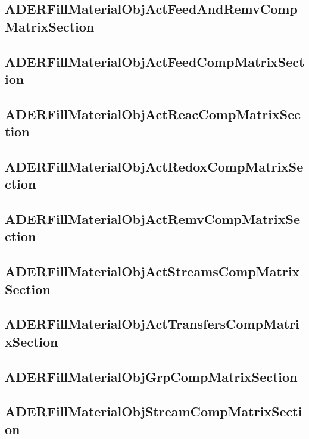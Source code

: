 \subsection{ADERFillMaterialObjActFeedAndRemvCompMatrixSection}


\subsection{ADERFillMaterialObjActFeedCompMatrixSection}


\subsection{ADERFillMaterialObjActReacCompMatrixSection}


\subsection{ADERFillMaterialObjActRedoxCompMatrixSection}


\subsection{ADERFillMaterialObjActRemvCompMatrixSection}


\subsection{ADERFillMaterialObjActStreamsCompMatrixSection}


\subsection{ADERFillMaterialObjActTransfersCompMatrixSection}


\subsection{ADERFillMaterialObjGrpCompMatrixSection}


\subsection{ADERFillMaterialObjStreamCompMatrixSection}


